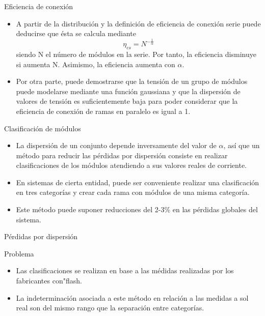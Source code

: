 \documentclass[xcolor={usenames,svgnames,dvipsnames}]{beamer}
\begin{document}
\begin{frame}[label=sec-2-2-3]{Eficiencia de conexión}
\begin{itemize}
\item A partir de la distribución y la definición de eficiencia de conexión serie puede deducirse que ésta se calcula mediante $$\eta_{cs}=N^{-\frac{1}{\alpha}}$$ siendo N el número de módulos en la serie. Por tanto, \alert{la eficiencia disminuye si aumenta N}. Asimismo, la eficiencia aumenta con $\alpha$.

\item Por otra parte, puede demostrarse que la \alert{tensión de un grupo de módulos} puede modelarse mediante una función \alert{gaussiana} y que \alert{la dispersión de valores de tensión es suficientemente baja para poder  considerar que la eficiencia de conexión de ramas en paralelo es igual a 1.}
\end{itemize}
\end{frame}

\begin{frame}[label=sec-2-2-4]{Clasificación de módulos}
\begin{itemize}
\item La dispersión de un conjunto depende inversamente del valor de
$\alpha$, así que un \alert{método para reducir las pérdidas por
dispersión} consiste en \alert{realizar clasificaciones} de los módulos
atendiendo a sus valores reales de corriente.

\item En sistemas de cierta entidad, puede ser conveniente realizar una
clasificación en tres categorías y crear cada rama con módulos de una
misma categoría.

\item Este método puede suponer reducciones del 2-3\% en las pérdidas
globales del sistema.
\end{itemize}
\end{frame}

\begin{frame}[label=sec-2-2-5]{Pérdidas por dispersión}
\begin{block}{Problema}
\begin{itemize}
\item Las clasificaciones se realizan en base a las médidas realizadas por
los fabricantes con"flash\guillemotright{}.

\item \alert{La indeterminación asociada a este método en relación a las medidas
a sol real son del mismo rango que la separación entre categorías.}
\end{itemize}
\end{block}
\end{frame}
\end{document}
